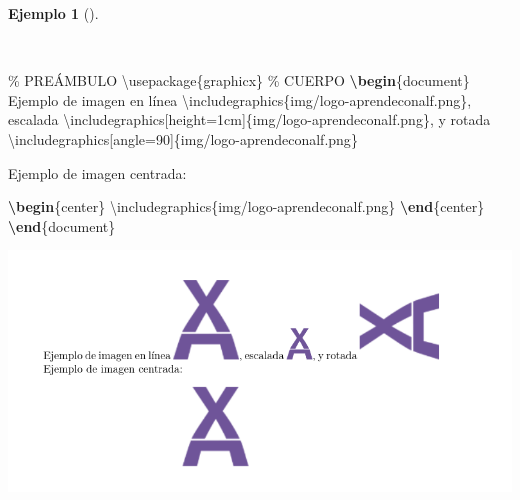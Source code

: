 \documentclass[
  a4paper,
]{scrreport}
\newenvironment{Shaded}{\begin{snugshade}}{\end{snugshade}}
\newcommand{\BuiltInTok}[1]{\textcolor[rgb]{0.00,0.23,0.31}{#1}}
\newcommand{\CommentTok}[1]{\textcolor[rgb]{0.37,0.37,0.37}{#1}}
\newcommand{\ExtensionTok}[1]{\textcolor[rgb]{0.00,0.23,0.31}{#1}}
\newcommand{\KeywordTok}[1]{\textcolor[rgb]{0.00,0.23,0.31}{\textbf{#1}}}
\newcommand{\NormalTok}[1]{\textcolor[rgb]{0.00,0.23,0.31}{#1}}
\theoremstyle{definition}
\newtheorem{example}{Ejemplo}[chapter]
\theoremstyle{remark}
\begin{document}
\begin{example}[]\protect\hypertarget{exm-imagenes}{}\label{exm-imagenes}

~

\begin{Shaded}
\begin{Highlighting}[]
\CommentTok{\% PREÁMBULO}
\BuiltInTok{\textbackslash{}usepackage}\NormalTok{\{}\ExtensionTok{graphicx}\NormalTok{\}}
\CommentTok{\% CUERPO}
\KeywordTok{\textbackslash{}begin}\NormalTok{\{}\ExtensionTok{document}\NormalTok{\}}
\NormalTok{Ejemplo de imagen en línea }
\BuiltInTok{\textbackslash{}includegraphics}\NormalTok{\{}\ExtensionTok{img/logo{-}aprendeconalf.png}\NormalTok{\}, }
\NormalTok{escalada}
\BuiltInTok{\textbackslash{}includegraphics}\NormalTok{[height=1cm]\{}\ExtensionTok{img/logo{-}aprendeconalf.png}\NormalTok{\},}
\NormalTok{y rotada}
\BuiltInTok{\textbackslash{}includegraphics}\NormalTok{[angle=90]\{}\ExtensionTok{img/logo{-}aprendeconalf.png}\NormalTok{\}}

\NormalTok{Ejemplo de imagen centrada:}

\KeywordTok{\textbackslash{}begin}\NormalTok{\{}\ExtensionTok{center}\NormalTok{\}}
\BuiltInTok{\textbackslash{}includegraphics}\NormalTok{\{}\ExtensionTok{img/logo{-}aprendeconalf.png}\NormalTok{\}}
\KeywordTok{\textbackslash{}end}\NormalTok{\{}\ExtensionTok{center}\NormalTok{\}}
\KeywordTok{\textbackslash{}end}\NormalTok{\{}\ExtensionTok{document}\NormalTok{\}}
\end{Highlighting}
\end{Shaded}

\begin{tcolorbox}[enhanced jigsaw, colframe=quarto-callout-note-color-frame, opacityback=0, title={Salida}, bottomrule=.15mm, left=2mm, coltitle=black, arc=.35mm, leftrule=.75mm, colback=white, rightrule=.15mm, colbacktitle=quarto-callout-note-color!10!white, toprule=.15mm, breakable, opacitybacktitle=0.6, bottomtitle=1mm, toptitle=1mm, titlerule=0mm]

\includegraphics{img/imagenes/imganes.png}

\end{tcolorbox}

\end{example}
\end{document}
